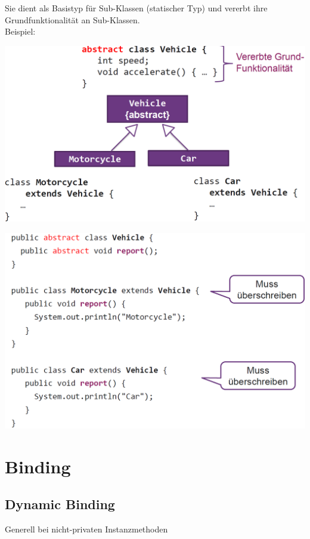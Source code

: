 Sie dient als Basistyp für Sub-Klassen (statischer Typ) und vererbt ihre Grundfunktionalität an Sub-Klassen.\\
Beispiel:\\
\begin{minipage}{0.5\columnwidth}
    \begin{center}
        \includegraphics[width=0.9\columnwidth]{pictures/abstrakte-Klasse-Bsp.png}
    \end{center}
\end{minipage}
\hfill
\begin{minipage}{0.5\columnwidth}
    \begin{center}
        \includegraphics[width=0.9\columnwidth]{pictures/abstrakte-Klasse-Bsp2.png}
    \end{center}
\end{minipage}

\section{Binding}
\subsection{Dynamic Binding}
Generell bei nicht-privaten Instanzmethoden

